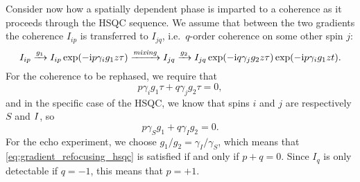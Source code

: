 Consider now how a spatially dependent phase is imparted to a coherence as it proceeds through the HSQC sequence.
We assume that between the two gradients the coherence $I_{ip}$ is transferred to $I_{jq}$, i.e.\ $q$-order coherence on some other spin $j$:
\begin{equation}
    \label{eq:shift_operator_evolution_grad}
    I_{ip} \xrightarrow[]{g_1} I_{ip} \exp(-\mathrm{i} p \gamma_i g_1 z \tau) \xrightarrow[]{\textit{mixing}} I_{jq} \xrightarrow[]{g_2} I_{jq}\exp(-\mathrm{i} q \gamma_j g_2 z \tau)\exp(-\mathrm{i} p \gamma_i g_1 z t).
\end{equation}
For the coherence to be rephased, we require that
\begin{equation}
    \label{eq:gradient_refocusing_condition}
    p\gamma_i g_1\tau + q\gamma_j g_2\tau = 0,
\end{equation}
and in the specific case of the HSQC, we know that spins $i$ and $j$ are respectively $S$ and $I\/$, so
\begin{equation}
    \label{eq:gradient_refocusing_hsqc}
    p\gamma_S g_1 + q\gamma_I g_2 = 0.
\end{equation}
For the echo experiment, we choose $g_1/g_2 = \gamma_I/\gamma_S$, which means that \cref{eq:gradient_refocusing_hsqc} is satisfied if and only if $p + q = 0$.
Since $I_{q}$ is only detectable if $q = -1$, this means that $p = +1$.

